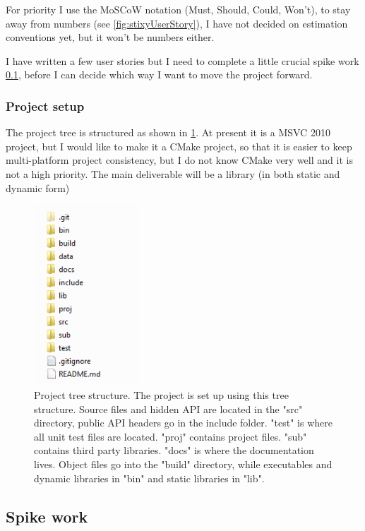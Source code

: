 \documentclass[11pt,fleqn,twoside]{article}
\begin{document}
For priority I use the MoSCoW notation\cite{AgileModUserStories} (Must, Should, Could, Won't), to stay away from numbers (see \ref{fig:stixyUserStory}), I have not decided on estimation conventions yet, but it won't be numbers either.

I have written a few user stories but I need to complete a little crucial spike work \ref{sec:spikeWork}, before I can decide which way I want to move the project forward.

\FloatBarrier
\subsubsection{Project setup}
The project tree is structured as shown in \ref{fig:projectSetup}. At present it is a MSVC 2010 project, but I would like to make it a CMake project, so that it is easier to keep multi-platform project consistency, but I do not know CMake very well and it is not a high priority. The main deliverable will be a library (in both static and dynamic form)

\begin{figure}
\centering
\includegraphics[width=0.35\textwidth]{project-structure}
\caption{Project tree structure. The project is set up using this 
tree structure. Source files and hidden API are located in the "src" directory,
public API headers go in the include folder. "test" is where all unit test files are located. "proj" contains project files. "sub" contains third party libraries. "docs" is where the documentation lives. Object files go into the "build" directory, while executables and dynamic libraries in "bin" and static libraries in "lib".
}
\label{fig:projectSetup}
\end{figure}


\FloatBarrier
\subsection{Spike work}
\label{sec:spikeWork}
\end{document}
